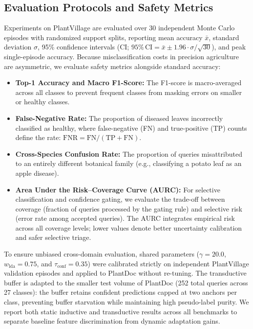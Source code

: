 \subsection{Evaluation Protocols and Safety Metrics}
\label{sec:metrics}
Experiments on PlantVillage are evaluated over 30 independent Monte Carlo episodes with randomized support splits, reporting mean accuracy $\bar{x}$, standard deviation $\sigma$, 95\% confidence intervals (CI; $95\%\,\text{CI} = \bar{x} \pm 1.96 \cdot \sigma / \sqrt{30}$), and peak single-episode accuracy. Because misclassification costs in precision agriculture are asymmetric, we evaluate safety metrics alongside standard accuracy:
\begin{itemize}
    \item \textbf{Top-1 Accuracy and Macro F1-Score:} The F1-score is macro-averaged across all classes to prevent frequent classes from masking errors on smaller or healthy classes.
    \item \textbf{False-Negative Rate:} The proportion of diseased leaves incorrectly classified as healthy, where false-negative (FN) and true-positive (TP) counts define the rate: $\text{FNR} = \text{FN} / (\text{TP} + \text{FN})$.
    \item \textbf{Cross-Species Confusion Rate:} The proportion of queries misattributed to an entirely different botanical family (e.g., classifying a potato leaf as an apple disease).
    \item \textbf{Area Under the Risk--Coverage Curve (AURC):} For selective classification and confidence gating, we evaluate the trade-off between coverage (fraction of queries processed by the gating rule) and selective risk (error rate among accepted queries). The AURC integrates empirical risk across all coverage levels; lower values denote better uncertainty calibration and safer selective triage.
\end{itemize}

To ensure unbiased cross-domain evaluation, shared parameters ($\gamma = 20.0$, $w_{\text{lda}} = 0.75$, and $\tau_{\text{conf}} = 0.35$) were calibrated strictly on independent PlantVillage validation episodes and applied to PlantDoc without re-tuning. The transductive buffer is adapted to the smaller test volume of PlantDoc (252 total queries across 27 classes): the buffer retains confident predictions capped at two anchors per class, preventing buffer starvation while maintaining high pseudo-label purity. We report both static inductive and transductive results across all benchmarks to separate baseline feature discrimination from dynamic adaptation gains.

